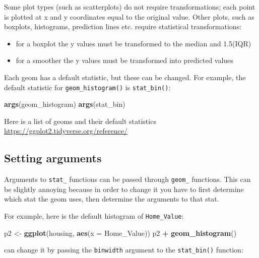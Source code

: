 \documentclass[]{book}
\newenvironment{Shaded}{\begin{snugshade}}{\end{snugshade}}
\newcommand{\DataTypeTok}[1]{\textcolor[rgb]{0.13,0.29,0.53}{#1}}
\newcommand{\KeywordTok}[1]{\textcolor[rgb]{0.13,0.29,0.53}{\textbf{#1}}}
\newcommand{\NormalTok}[1]{#1}
\newcommand{\OperatorTok}[1]{\textcolor[rgb]{0.81,0.36,0.00}{\textbf{#1}}}
\newcommand{\StringTok}[1]{\textcolor[rgb]{0.31,0.60,0.02}{#1}}
\providecommand{\tightlist}{%
  \setlength{\itemsep}{0pt}\setlength{\parskip}{0pt}}
\begin{document}
Some plot types (such as scatterplots) do not require transformations; each point is plotted at x and y coordinates equal to the original value. Other plots, such as boxplots, histograms, prediction lines etc. require statistical transformations:

\begin{itemize}
\tightlist
\item
  for a boxplot the y values must be transformed to the median and 1.5(IQR)
\item
  for a smoother the y values must be transformed into predicted values
\end{itemize}

Each geom has a default statistic, but these can be changed. For example, the default statistic for \texttt{geom\_histogram()} is \texttt{stat\_bin()}:

\begin{Shaded}
\begin{Highlighting}[]
\KeywordTok{args}\NormalTok{(geom_histogram)}
\KeywordTok{args}\NormalTok{(stat_bin)}
\end{Highlighting}
\end{Shaded}

Here is a list of geoms and their default statistics \url{https://ggplot2.tidyverse.org/reference/}

\hypertarget{setting-arguments}{%
\subsection{Setting arguments}\label{setting-arguments}}

Arguments to \texttt{stat\_} functions can be passed through \texttt{geom\_} functions. This can be slightly annoying because in order to change it you have to first determine which stat the geom uses, then determine the arguments to that stat.

For example, here is the default histogram of \texttt{Home\_Value}:

\begin{Shaded}
\begin{Highlighting}[]
\NormalTok{p2 <-}\StringTok{ }\KeywordTok{ggplot}\NormalTok{(housing, }\KeywordTok{aes}\NormalTok{(}\DataTypeTok{x =}\NormalTok{ Home_Value))}
\NormalTok{p2 }\OperatorTok{+}\StringTok{ }\KeywordTok{geom_histogram}\NormalTok{()}
\end{Highlighting}
\end{Shaded}

can change it by passing the \texttt{binwidth} argument to the \texttt{stat\_bin()} function:
\end{document}
